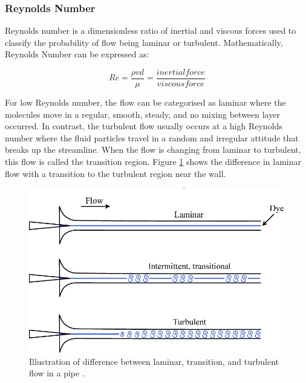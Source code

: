 \subsubsection{Reynolds Number}
Reynolds number is a dimensionless ratio of inertial and viscous forces used to classify the probability of flow being laminar or turbulent\cite{Rehm2008SituationalMPD}. Mathematically, Reynolds Number can be expressed as:

\begin{equation}
Re = \frac{\rho v d}{\mu} = \frac{inertial force}{viscous force}
\end{equation}

\noindent For low Reynolds number, the flow can be categorised as laminar where the molecules move in a regular, smooth, steady, and no mixing between layer occurred\cite{Obidi2014TheoryVehicles}. In contrast, the turbulent flow usually occurs at a high Reynolds number where the fluid particles travel in a random and irregular attitude that breaks up the streamline. When the flow is changing from laminar to turbulent, this flow is called the transition region. Figure \ref{fig:2} shows the difference in laminar flow with a transition to the turbulent region near the wall. 

\begin{figure}[!htb]
    \centering
    \includegraphics[scale=0.4]{Figures/laminar_turbulent_difference.jpg}
    \caption{Illustration of difference between laminar, transition, and turbulent flow in a pipe \cite{D.BARKLE2016TheoreticalPipe}.}
    \label{fig:2}
\end{figure}

